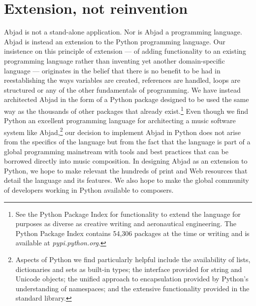 \documentclass{article}
\begin{document}
\section{Extension, not reinvention} \label{sec:extension}

Abjad is not a stand-alone application. Nor is Abjad a programming language.
Abjad is instead an extension to the Python programming language. Our
insistence on this principle of extension --- of adding functionality to an
existing programming language rather than inventing yet another domain-specific
language --- originates in the belief that there is no benefit to be had in
reestablishing the ways variables are created, references are handled, loops
are structured or any of the other fundamentals of programming. We have instead
architected Abjad in the form of a Python package designed to be used the same
way as the thousands of other packages that already exist.\footnote{See the
Python Package Index for functionality to extend the language for purposes as
diverse as creative writing and aeronautical engineering. The Python Package
Index contains 54,306 packages at the time or writing and is available at
\textit{pypi.python.org}.} Even though we find Python an excellent programming
language for architecting a music software system like Abjad,\footnote{Aspects
of Python we find particularly helpful include the availability of lists,
dictionaries and sets as built-in types; the interface provided for string and
Unicode objects; the unified approach to encapsulation provided by Python's
understanding of namespaces; and the extensive functionality provided in the
standard library.} our decision to implement Abjad in Python does not arise
from the specifics of the language but from the fact that the language is part
of a global programming mainstream with tools and best practices that can be
borrowed directly into music composition. In designing Abjad as an extension to
Python, we hope to make relevant the hundreds of print and Web resources that
detail the language and its features. We also hope to make the global community
of developers working in Python available to composers.

\end{document}
